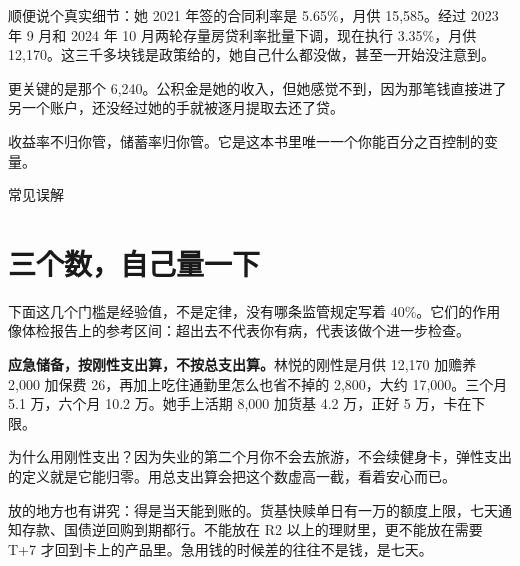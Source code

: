 顺便说个真实细节：她 2021 年签的合同利率是 5.65\%，月供 15,585。经过 2023 年 9 月和 2024 年 10 月两轮存量房贷利率批量下调，现在执行 3.35\%，月供 12,170。这三千多块钱是政策给的，她自己什么都没做，甚至一开始没注意到。

更关键的是那个 6,240。公积金是她的收入，但她感觉不到，因为那笔钱直接进了另一个账户，还没经过她的手就被逐月提取去还了贷。

\begin{pullquote}{}
收益率不归你管，储蓄率归你管。它是这本书里唯一一个你能百分之百控制的变量。
\end{pullquote}

\begin{mythbox}{常见误解}
\end{mythbox}

\section{三个数，自己量一下}

下面这几个门槛是经验值，不是定律，没有哪条监管规定写着 40\%。它们的作用像体检报告上的参考区间：超出去不代表你有病，代表该做个进一步检查。

\textbf{应急储备，按刚性支出算，不按总支出算。}林悦的刚性是月供 12,170 加赡养 2,000 加保费 26，再加上吃住通勤里怎么也省不掉的 2,800，大约 17,000。三个月 5.1 万，六个月 10.2 万。她手上活期 8,000 加货基 4.2 万，正好 5 万，卡在下限。

为什么用刚性支出？因为失业的第二个月你不会去旅游，不会续健身卡，弹性支出的定义就是它能归零。用总支出算会把这个数虚高一截，看着安心而已。

放的地方也有讲究：得是当天能到账的。货基快赎单日有一万的额度上限，七天通知存款、国债逆回购到期都行。不能放在 R2 以上的理财里，更不能放在需要 T+7 才回到卡上的产品里。急用钱的时候差的往往不是钱，是七天。

